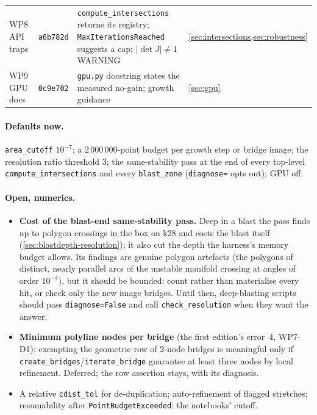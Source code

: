 \documentclass[11pt,a4paper]{article}
\newcommand{\code}[1]{\texttt{#1}}
\begin{document}
\begin{table}[htbp]
\begin{tabularx}{\textwidth}{@{}>{\raggedright\arraybackslash}p{2.7cm} >{\raggedright\arraybackslash}p{1.25cm} Y Y@{}}
WP8 API traps & \code{a6b782d} & \code{compute\_intersections} returns its registry; \code{MaxIterationsReached} suggests a cap; $|\det J|\ne1$ WARNING & \cref{sec:intersections,sec:robustness} \\
WP9 GPU docs & \code{0c9e702} & \code{gpu.py} docstring states the measured no-gain; growth guidance & \cref{sec:gpu} \\
\bottomrule
\end{tabularx}
\end{table}

\paragraph{Defaults now.} \code{area\_cutoff} $10^{-7}$; a 2\,000\,000-point
budget per growth step or bridge image; the resolution ratio threshold 3;
the same-stability pass at the end of every top-level
\code{compute\_intersections} and every \code{blast\_zone} (\code{diagnose=}
opts out); GPU off.

\paragraph{Open, numerics.}
\begin{itemize}[leftmargin=*]
\item \textbf{Cost of the blast-end same-stability pass.} Deep in a blast
  the pass finds up to \NumDeepPassHitsEndKTwoEight{} polygon crossings in
  the box on k28 and costs \NumDeepPassCostEndKTwoEight{} the blast itself
  (\cref{sec:blastdepth-resolution}); it also cut the depth the harness's
  memory budget allows. Its findings are genuine polygon artefacts (the
  polygons of distinct, nearly parallel arcs of the unstable manifold crossing
  at angles of order $10^{-4}$), but it should be
  bounded: count rather than materialise every hit, or check only the new
  image bridges. Until then, deep-blasting scripts should pass
  \code{diagnose=False} and call \code{check\_resolution} when they want the
  answer.
\item \textbf{Minimum polyline nodes per bridge} (the first edition's error~4,
  WP7-D1): exempting the geometric row of 2-node bridges is meaningful only
  if \code{create\_bridges}/\code{iterate\_bridge} guarantee at least three
  nodes by local refinement. Deferred; the row assertion stays, with its
  diagnosis.
\item A relative \code{cdist\_tol} for de-duplication; auto-refinement of
  flagged stretches; resumability after \code{PointBudgetExceeded}; the
  notebooks' cutoff.
\end{itemize}
\end{document}
